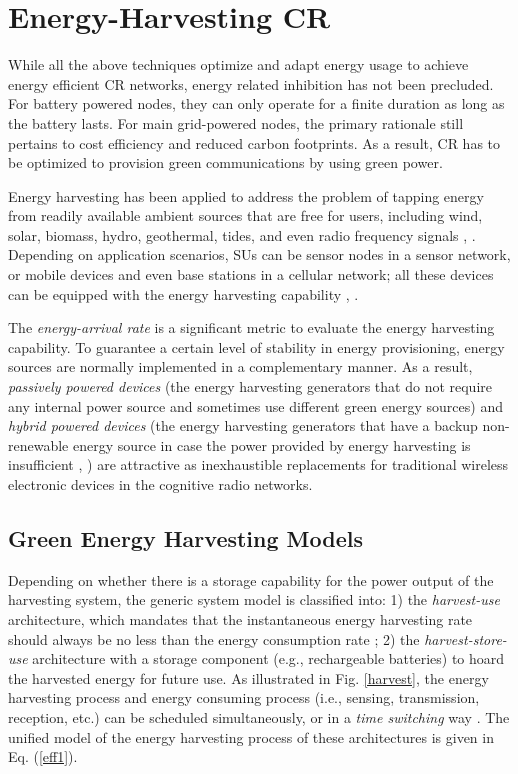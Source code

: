 \documentclass[journal,12pt,onecolumn]{IEEEtran}
\begin{document}
\section{Energy-Harvesting CR}
While all the above techniques optimize and adapt energy usage to achieve energy efficient CR networks, energy related inhibition has not been precluded. For battery powered nodes, they can only operate for a finite duration as long as the battery lasts. For main grid-powered nodes, the primary rationale still pertains to cost efficiency and reduced carbon footprints. As a result, CR has to be optimized to provision green communications by using green power. 

Energy harvesting has been applied to address the problem of tapping energy from readily available ambient sources that are free for users, including wind, solar, biomass, hydro, geothermal, tides, and even radio frequency signals \cite{RF}, \cite{RFHARVESTOR}. Depending on application scenarios, SUs can be sensor nodes in a sensor network, or mobile devices and even base stations in a cellular network; all these devices can be equipped with the energy harvesting capability \cite{Kansal:2007:PME:1274858.1274870}, \cite{Han:2014:PMN}.

The \emph{energy-arrival rate} is a significant metric to evaluate the energy harvesting capability. To guarantee a certain level of stability in energy provisioning, energy sources are normally implemented in a complementary manner. As a result, \emph{passively powered devices} (the energy harvesting generators that do not require any internal power source \cite{RF} and sometimes use different green energy sources) and \emph{hybrid powered devices} (the energy harvesting generators that have a backup non-renewable energy source in case the power provided by energy harvesting is insufficient \cite{Han:2012:OCS}, \cite{Han:2012:ICE}) are attractive as inexhaustible replacements for traditional wireless electronic devices in the cognitive radio networks.

\subsection{Green Energy Harvesting Models}
Depending on whether there is a storage capability for the power output of the harvesting system, the generic system model is classified into: 1) the \emph{harvest-use} architecture, which mandates that the instantaneous energy harvesting rate should always be no less than the energy consumption rate \cite{Kansal:2007:PME:1274858.1274870}; 2) the \emph{harvest-store-use} architecture with a storage component (e.g., rechargeable batteries) to hoard the harvested energy for future use. As illustrated in Fig. \ref{harvest}, the energy harvesting process and energy consuming process (i.e., sensing, transmission, reception, etc.) can be scheduled simultaneously, or in a \emph{time switching} way \cite{6489506}. The unified model of the energy harvesting process of these architectures is given in Eq. (\ref{eff1}).
\end{document}
